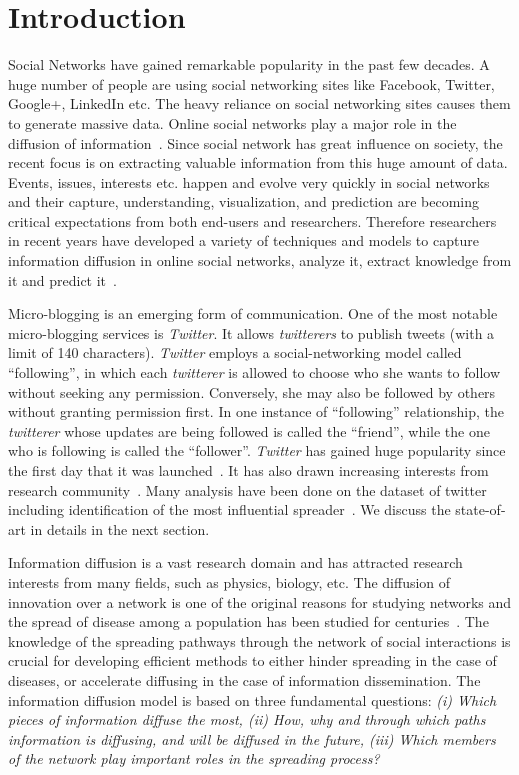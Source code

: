 \documentclass[sigconf]{acmart}
\begin{document}
\section{Introduction}
Social Networks have gained remarkable popularity in the past few decades. A huge
number of people are using social networking sites like Facebook, Twitter, Google+, LinkedIn etc. The heavy reliance on social networking sites causes them to generate massive data. Online social networks play a major role in the diffusion of information~\cite{bakshy2012role}. Since social network has great influence on society, the recent focus is on extracting valuable information from this huge amount of data. Events, issues, interests etc. happen and evolve very quickly in social networks and their capture, understanding, visualization, and prediction are becoming critical expectations from both end-users and researchers. Therefore researchers in recent years have developed a variety of techniques and models to capture information diffusion in online social networks, analyze it, extract knowledge from it and predict it~\cite{agichtein2008finding,doerr2012rumors}. 

Micro-blogging is an emerging form of communication. One of the most notable micro-blogging services is \emph{Twitter}. It allows \emph{twitterers} to publish tweets (with a limit of 140 characters). \emph{Twitter} employs a social-networking model called ``following'', in which each \emph{twitterer} is allowed to choose who she wants to follow without seeking any permission. Conversely, she may also be followed by others without granting permission first. In one instance of ``following'' relationship, the \emph{twitterer} whose updates are being followed is called the ``friend'', while the one who is following is called the ``follower''. \emph{Twitter} has gained huge popularity since the first day that it was launched~\cite{milstein2008twitter}. It has also drawn increasing interests from research community~\cite{cheng2009inside}. Many analysis have been done on the dataset of twitter including identification of the most influential spreader~\cite{pal2011identifying,weng2010twitterrank}. We discuss the state-of-art in details in the next section. 

Information diffusion is a vast research domain and has attracted research interests from many fields, such as physics, biology, etc. The diffusion of innovation over a network is one of the original reasons for studying networks and the spread of disease among a population has been studied for centuries~\cite{anderson1992infectious,heesterbeek2000mathematical,keeling2008modeling}. The knowledge of the spreading pathways through the network of social interactions is crucial for developing efficient methods to either hinder spreading in the case of diseases, or accelerate diffusing in the case of information dissemination. The information diffusion model is based on three fundamental questions: \emph{(i) Which pieces of information diffuse the most, (ii) How, why and through which paths information is diffusing, and will be diffused in the future, (iii) Which members of the network play important roles in the spreading process?}
\end{document}
